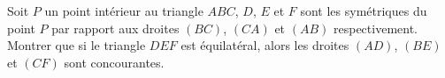 \documentclass[varwidth]{standalone}
\begin{document}
    Soit $P$ un point int\'erieur au triangle $ABC$, $D$, $E$ et $F$ sont les sym\'etriques du point $P$ par rapport aux droites $(BC)$, $(CA)$ et $(AB)$ respectivement. Montrer que si le triangle $DEF$ est \'equilat\'eral, alors les droites $(AD)$, $(BE)$ et $(CF)$ sont concourantes.
\end{document}
